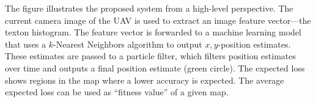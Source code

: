 \label{fig:highleveloverview}
The figure illustrates the proposed system from a high-level perspective. The current camera image of the UAV is used to extract an image feature vector---the texton histogram. The feature vector is forwarded to a machine learning model that uses a $k$-Nearest Neighbors algorithm to output $x,y$-position estimates. These estimates are passed to a particle filter, which filters position estimates over time and outputs a final position estimate (green circle). The expected loss shows regions in the map where a lower accuracy is expected. The average expected loss can be used as ``fitness value'' of a given map. 